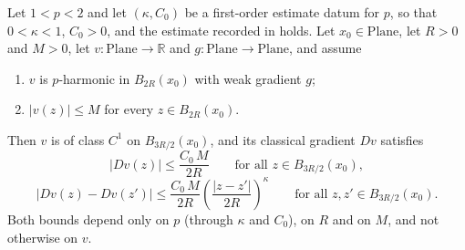 \begin{lemma}
Let $1<p<2$ and let $(\kappa,C_0)$ be a first-order estimate datum for $p$, so that
$0<\kappa<1$, $C_0>0$, and the estimate recorded in  holds.
Let $x_0\in\mathrm{Plane}$, let $R>0$ and $M>0$, let $v\colon\mathrm{Plane}\to\mathbb{R}$ and
$g\colon\mathrm{Plane}\to\mathrm{Plane}$, and assume
\begin{enumerate}
\item $v$ is $p$-harmonic in $B_{2R}(x_0)$ with weak gradient $g$;
\item $\lvert v(z)\rvert\le M$ for every $z\in B_{2R}(x_0)$.
\end{enumerate}
Then $v$ is of class $C^{1}$ on $B_{3R/2}(x_0)$, and its classical gradient $Dv$ satisfies
\[
  \lvert Dv(z)\rvert\le\frac{C_0\,M}{2R}\qquad\text{for all }z\in B_{3R/2}(x_0),
\]
\[
  \lvert Dv(z)-Dv(z')\rvert\le\frac{C_0\,M}{2R}\left(\frac{\lvert z-z'\rvert}{2R}\right)^{\kappa}
  \qquad\text{for all }z,z'\in B_{3R/2}(x_0).
\]
Both bounds depend only on $p$ (through $\kappa$ and $C_0$), on $R$ and on $M$, and not
otherwise on $v$.
\end{lemma}
